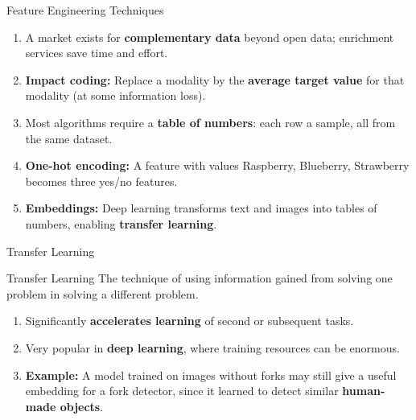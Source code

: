 \begin{frame}{Feature Engineering Techniques}
\begin{enumerate}
\item<1-> A market exists for \textbf{complementary data} beyond open data; enrichment services save time and effort.
\item<2-> \textbf{Impact coding:} Replace a modality by the \textbf{average target value} for that modality (at some information loss).
\item<3-> Most algorithms require a \textbf{table of numbers}: each row a sample, all from the same dataset.
\item<4-> \textbf{One-hot encoding:} A feature with values Raspberry, Blueberry, Strawberry becomes three yes/no features.
\item<5-> \textbf{Embeddings:} Deep learning transforms text and images into tables of numbers, enabling \textbf{transfer learning}.
\end{enumerate}
\end{frame}

\begin{frame}{Transfer Learning}
\begin{block}{Transfer Learning}
The technique of using information gained from solving one problem in solving a different problem.
\end{block}
\vspace{0.2cm}
\begin{enumerate}
\item<1-> Significantly \textbf{accelerates learning} of second or subsequent tasks.
\item<2-> Very popular in \textbf{deep learning}, where training resources can be enormous.
\item<3-> \textbf{Example:} A model trained on images without forks may still give a useful embedding for a fork detector, since it learned to detect similar \textbf{human-made objects}.
\end{enumerate}
\end{frame}

